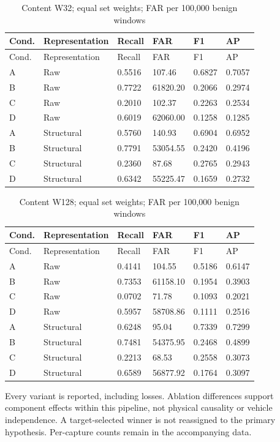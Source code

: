 \documentclass[12pt,a4paper,oneside,openany]{extbook}
\begin{document}
\begin{longtable}{P{1.1cm}P{4.2cm}P{1.6cm}P{2.2cm}P{1.6cm}P{1.6cm}}
\caption{Content W32; equal set weights; FAR per 100,000 benign windows}\label{tab:extension-w32}\\\toprule
Cond. & Representation & Recall & FAR & F1 & AP\\\midrule\endfirsthead
\toprule
Cond. & Representation & Recall & FAR & F1 & AP\\\midrule\endhead
A & Raw & 0.5516 & 107.46 & 0.6827 & 0.7057\\
B & Raw & 0.7722 & 61820.20 & 0.2066 & 0.2974\\
C & Raw & 0.2010 & 102.37 & 0.2263 & 0.2534\\
D & Raw & 0.6019 & 62060.00 & 0.1258 & 0.1285\\
A & Structural & 0.5760 & 140.93 & 0.6904 & 0.6952\\
B & Structural & 0.7791 & 53054.55 & 0.2420 & 0.4196\\
C & Structural & 0.2360 & 87.68 & 0.2765 & 0.2943\\
D & Structural & 0.6342 & 55225.47 & 0.1659 & 0.2732\\
\bottomrule\end{longtable}
\begin{longtable}{P{1.1cm}P{4.2cm}P{1.6cm}P{2.2cm}P{1.6cm}P{1.6cm}}
\caption{Content W128; equal set weights; FAR per 100,000 benign windows}\label{tab:extension-w128}\\\toprule
Cond. & Representation & Recall & FAR & F1 & AP\\\midrule\endfirsthead
\toprule
Cond. & Representation & Recall & FAR & F1 & AP\\\midrule\endhead
A & Raw & 0.4141 & 104.55 & 0.5186 & 0.6147\\
B & Raw & 0.7353 & 61158.10 & 0.1954 & 0.3903\\
C & Raw & 0.0702 & 71.78 & 0.1093 & 0.2021\\
D & Raw & 0.5957 & 58708.86 & 0.1111 & 0.2516\\
A & Structural & 0.6248 & 95.04 & 0.7339 & 0.7299\\
B & Structural & 0.7481 & 54375.95 & 0.2468 & 0.4899\\
C & Structural & 0.2213 & 68.53 & 0.2558 & 0.3073\\
D & Structural & 0.6589 & 56877.92 & 0.1764 & 0.3097\\
\bottomrule\end{longtable}
Every variant is reported, including losses. Ablation differences support component effects within this pipeline, not physical causality or vehicle independence. A target-selected winner is not reassigned to the primary hypothesis. Per-capture counts remain in the accompanying data.
\end{document}
